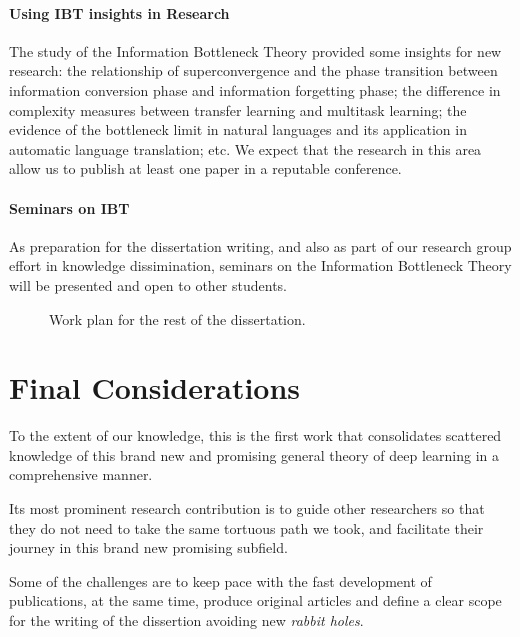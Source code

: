\paragraph{Using IBT insights in Research} The study of the Information Bottleneck Theory provided some insights for new research: the relationship of superconvergence and the phase transition between information conversion phase and information forgetting phase; the difference in complexity measures between transfer learning and multitask learning; the evidence of the bottleneck limit in natural languages and its application in automatic language translation; etc. We expect that the research in this area allow us to publish at least one paper in a reputable conference.
\paragraph{Seminars on IBT} As preparation for the dissertation writing, and also as part of our research group effort in knowledge dissimination, seminars on the Information Bottleneck Theory will be presented and open to other students.

\begin{figure}[ht]
	\centering {}


	\caption{Work plan for the rest of the dissertation.}
\end{figure}


\section{Final Considerations}

To the extent of our knowledge, this is the first work that consolidates scattered knowledge of this brand new and promising general theory of deep learning in a comprehensive manner.

Its most prominent research contribution is to guide other researchers so that they do not need to take the same tortuous path we took, and facilitate their journey in this brand new promising subfield.

Some of the challenges are to keep pace with the fast development of publications, at the same time, produce original articles and define a clear scope for the writing of the dissertion avoiding new \emph{rabbit holes}.
